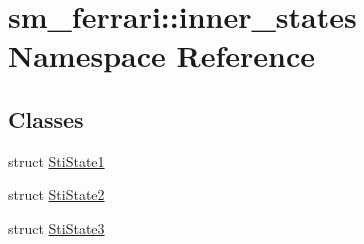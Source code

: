\hypertarget{namespacesm__ferrari_1_1inner__states}{}\section{sm\+\_\+ferrari\+:\+:inner\+\_\+states Namespace Reference}
\label{namespacesm__ferrari_1_1inner__states}
\subsection*{Classes}
\begin{DoxyCompactItemize}
\item 
struct \hyperlink{structsm__ferrari_1_1inner__states_1_1StiState1}{Sti\+State1}
\item 
struct \hyperlink{structsm__ferrari_1_1inner__states_1_1StiState2}{Sti\+State2}
\item 
struct \hyperlink{structsm__ferrari_1_1inner__states_1_1StiState3}{Sti\+State3}
\end{DoxyCompactItemize}
